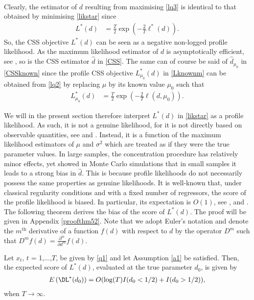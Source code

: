 {{\begin{align}
\end{align}
Clearly, the estimator of $d$ resulting from maximising \eqref{lq3} is identical to that obtained by minimising \eqref{likstar} since
\begin{align}
     L^*(d) &=  \frac{T}{2}  \exp \left( -\frac{2}{T} \ell^*(d) \right).  \label{Lstar}
\end{align}
So, the CSS objective $L^*(d)$ can be seen as a negative non-logged profile likelihood. As the maximum likelihood estimator of $d$ is asymptotically efficient, see \textcite{hualde2020truncated}, so is the CSS estimator $\hat d$ in
\eqref{CSS}. The same can of course be said of $\hat d_{\mu_0}$ in \eqref{CSSknown} since the profile CSS objective $ L^*_{\mu_0}(d)$ in \eqref{Lknownm} can be obtained from \eqref{lq2} by replacing $\mu$ by its known value
$\mu_0$ such that
\begin{align}
 L^*_{\mu_0}(d) &= \frac{T}{2}  \exp \left( -\frac{2}{T} \ell(d,\mu_0) \right) . \label{Lmulog}
\end{align}

We will in the present section therefore interpret $L^*(d)$ in \eqref{likstar} as a profile likelihood. As such, it is not a genuine likelihood, for it is not directly based on observable quantities, see \textcite{barndorff1983formula} and
\textcite{severini2000likelihood}. Instead, it is a function of the maximum likelihood estimators of $\mu$ and $\sigma^2$ which are treated as if they were the true parameter values. In large samples, the concentration procedure has
relatively minor effects, yet \textcite{chung1993small} showed in Monte Carlo simulations that in small samples it leads to a strong bias in $\hat{d}$. This is because profile likelihoods do not necessarily
possess the same properties as genuine likelihoods. It is well-known that, under classical regularity conditions and with a fixed number of regressors, the score of the profile likelihood is biased. In particular, its expectation
is $O(1)$, see \textcite{kalbfleisch1973marginal}, \textcite{mccullagh1990simple} and \textcite{liang1995inference}. The following theorem derives the bias of the score of $L^*(d)$. The proof will be given in Appendix
\ref{proofthm52}. Note that we adopt Euler's notation and denote the $m^\text{th}$ derivative of a function $f(d)$ with respect to $d$ by the operator $D^m$ such that $D^mf(d) = \frac{\partial^m}{\partial d^m} f(d)$.

\begin{theorem}\label{score_1} 
  Let $x_t$, $t$ = 1,$\ldots$,$T$, be given by \eqref{q1} and let Assumption \ref{a1} be satisfied. Then, the expected score of $L^* (d)$, evaluated at the true parameter $d_0$, is given by
\begin{align}
    E\left( \DL^*(d_0) \right) = O( \log(T)I(d_0 < 1/2) + I(d_0 > 1/2) ), \label{score1}
\end{align}
when $T \rightarrow \infty$.
\end{theorem}

}}
